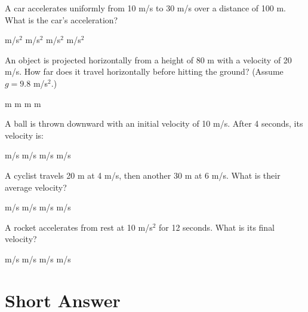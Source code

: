 \documentclass[addpoints]{exam}
\begin{document}
\begin{questions}
\question[1] A car accelerates uniformly from 10 m/s to 30 m/s over a distance of 100 m. What is the car’s acceleration?
\begin{choices}
 m/s$^2$
 m/s$^2$
 m/s$^2$
 m/s$^2$
\end{choices}

\question[1] An object is projected horizontally from a height of 80 m with a velocity of 20 m/s. How far does it travel horizontally before hitting the ground? (Assume $g = 9.8$ m/s$^2$.)
\begin{choices}
 m
 m
 m
 m
\end{choices}

\question[1] A ball is thrown downward with an initial velocity of 10 m/s. After 4 seconds, its velocity is:
\begin{choices}
 m/s
 m/s
 m/s
 m/s
\end{choices}

\question[1] A cyclist travels 20 m at 4 m/s, then another 30 m at 6 m/s. What is their average velocity?
\begin{choices}
 m/s
 m/s
 m/s
 m/s
\end{choices}

\question[1] A rocket accelerates from rest at 10 m/s$^2$ for 12 seconds. What is its final velocity?
\begin{choices}
 m/s
 m/s
 m/s
 m/s
\end{choices}



\section*{Short Answer}


\end{questions}
\end{document}
